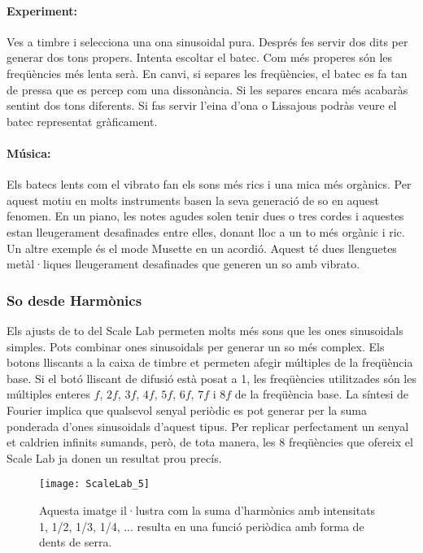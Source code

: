 \paragraph{Experiment:} Ves a timbre i selecciona una ona sinusoidal pura. Després fes servir dos dits per generar dos tons propers. Intenta escoltar el batec. Com més properes són les freqüències més lenta serà. En canvi, si separes les freqüències, el batec es fa tan de pressa que es percep com una dissonància. Si les separes encara més acabaràs sentint dos tons diferents. Si fas servir l'eina d'ona o Lissajous podràs veure el batec representat gràficament.

\paragraph{Música:}Els batecs lents com el vibrato fan els sons més rics i una mica més orgànics. Per aquest motiu en molts instruments basen la seva generació de so en aquest fenomen. En un piano, les notes agudes solen tenir dues o tres cordes i aquestes estan lleugerament desafinades entre elles, donant lloc a un to més orgànic i ric. Un altre exemple és el mode Musette en un acordió. Aquest té dues llenguetes metàl·liques lleugerament desafinades que generen un so amb vibrato.

\subsubsection{So desde Harmònics}
Els ajusts de to del Scale Lab permeten molts més sons que les ones sinusoidals simples. Pots combinar ones sinusoidals per generar un so més complex. Els botons lliscants a la caixa de timbre et permeten afegir múltiples de la freqüència base. Si el botó lliscant de difusió està posat a 1, les freqüències utilitzades són les múltiples enteres $f$, $2f$, $3f$, $4f$, $5f$, $6f$, $7f$ i $8f$ de la freqüència base. La síntesi de Fourier implica que qualsevol senyal periòdic es pot generar per la suma ponderada d'ones sinusoidals d'aquest tipus. Per replicar perfectament un senyal et caldrien infinits sumands, però, de tota manera, les 8 freqüències que ofereix el Scale Lab ja donen un resultat prou precís.

\begin{figure}
\centering
\texttt{[image: ScaleLab\_5]}
\caption*{Aquesta imatge il·lustra com la suma d'harmònics amb intensitats 1, 1/2, 1/3, 1/4, ... resulta en una funció periòdica amb forma de dents de serra.}
\end{figure}

